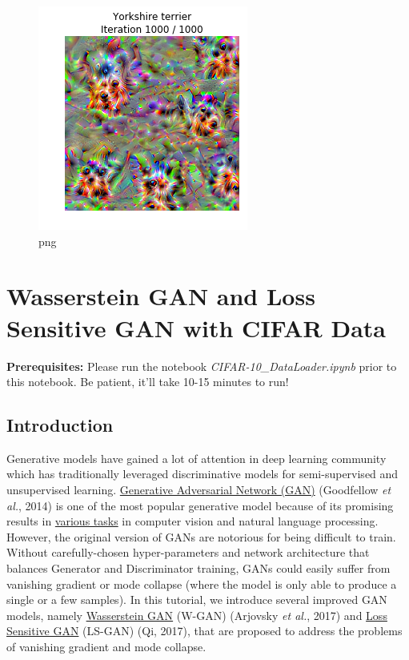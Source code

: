 \documentclass[]{book}
\theoremstyle{definition}
\theoremstyle{definition}
\theoremstyle{definition}
\theoremstyle{remark}
\begin{document}
\begin{figure}
\centering
\includegraphics{Network-Visualization-TensorFlow_files/Network-Visualization-TensorFlow_24_41.png}
\caption{png}
\end{figure}

\chapter{Wasserstein GAN and Loss Sensitive GAN with CIFAR
Data}\label{wasserstein-gan-and-loss-sensitive-gan-with-cifar-data}

\textbf{Prerequisites: } Please run the notebook
\emph{CIFAR-10\_DataLoader.ipynb} prior to this notebook. Be patient,
it'll take 10-15 minutes to run!

\section{Introduction}\label{introduction}

Generative models have gained a lot of attention in deep learning
community which has traditionally leveraged discriminative models for
semi-supervised and unsupervised learning.
\href{https://arxiv.org/pdf/1406.2661v1.pdf}{Generative Adversarial
Network (GAN)} (Goodfellow \emph{et al.}, 2014) is one of the most
popular generative model because of its promising results in
\href{https://github.com/HKCaesar/really-awesome-gan}{various tasks} in
computer vision and natural language processing. However, the original
version of GANs are notorious for being difficult to train. Without
carefully-chosen hyper-parameters and network architecture that balances
Generator and Discriminator training, GANs could easily suffer from
vanishing gradient or mode collapse (where the model is only able to
produce a single or a few samples). In this tutorial, we introduce
several improved GAN models, namely
\href{https://arxiv.org/pdf/1701.07875.pdf}{Wasserstein GAN} (W-GAN)
(Arjovsky \emph{et al.}, 2017) and
\href{https://arxiv.org/pdf/1701.06264.pdf}{Loss Sensitive GAN} (LS-GAN)
(Qi, 2017), that are proposed to address the problems of vanishing
gradient and mode collapse.
\end{document}
